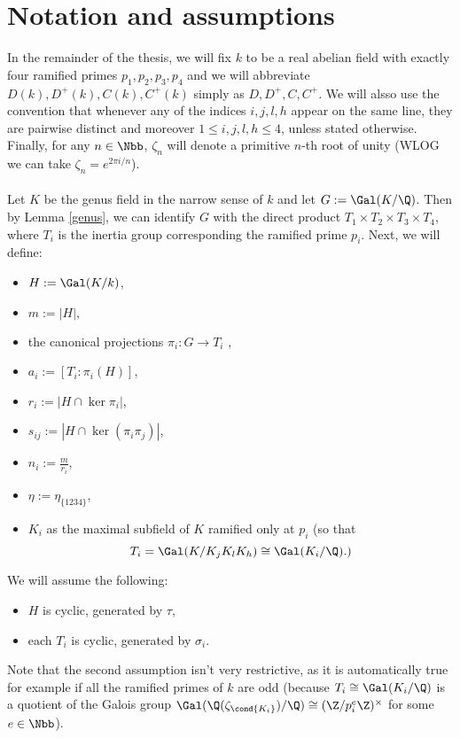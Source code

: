 \section{Notation and assumptions}
In the remainder of the thesis, we will fix $k$ to be a real abelian field with exactly four ramified primes $p_1,p_2,p_3,p_4$ and we will abbreviate $D(k),D^{+}(k),C(k),C^+(k)$ simply as $D,D^{+},C,C^+$. We will alsso use the convention that whenever any of the indices $i,j,l,h$ appear on the same line, they are pairwise distinct and moreover $1\leq i,j,l,h\leq 4$, unless stated otherwise. Finally, for any $n\in \Nbb$, $\zeta_n$ will denote a primitive $n$-th root of unity (WLOG we can take $\zeta_n=e^{2\pi i/n}$). 

\paragraph*{}
Let $K$ be the genus field in the narrow sense of $k$ and let $G:=\Gal(K/\Q)$. Then by Lemma \ref{genus}, we can identify $G$ with the direct product $T_1\times T_2\times T_3\times T_4$, where $T_i$ is the inertia group corresponding the ramified prime $p_i$. Next, we will define:

\begin{itemize}
\item $H:=\Gal(K/k)$, 
\item $m:=|H|,$
\item the canonical projections $\pi_i:G\to T_i$ ,
\item $a_i:=[T_i:\pi_i(H)]$,
\item $r_i:=|H\cap \ker \pi_i|$,
\item $s_{ij}:=|H\cap \ker (\pi_i\pi_j)|$,
\item $n_i:=\frac{m}{r_i}$,
\item $\eta:=\eta_{\{1234\}}$,
\item $K_i$ as the maximal subfield of $K$ ramified only at $p_i$ (so that $$T_i=\Gal(K/K_jK_lK_h)\cong \Gal(K_i/\Q).)$$
\end{itemize}

We will assume the following: \label{assum}
\begin{itemize}
\item $H$ is cyclic, generated by $\tau$,
\item each $T_i$ is cyclic, generated by $\sigma_i$.
\end{itemize}
Note that the second assumption isn't very restrictive, as it is automatically true for example if all the ramified primes of $k$ are odd (because $T_i\cong \Gal(K_i/\Q)$ is a quotient of the Galois group $\Gal(\Q(\zeta_{\cond{K_i}})/\Q)\cong (\Z/p_i^e\Z)^{\times}$ for some $e\in\Nbb$).

